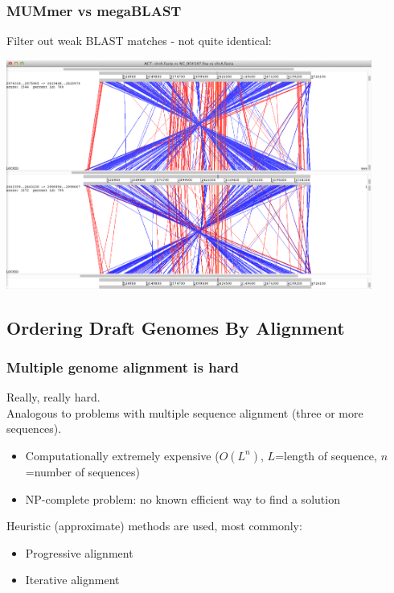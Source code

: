 \begin{frame}
  \frametitle{MUMmer vs megaBLAST}
  Filter out weak BLAST matches - not quite identical:
  \begin{center}
    \includegraphics[width=0.9\textwidth]{images/act_wgs10}
  \end{center}    
\end{frame}

\subsection{Ordering Draft Genomes By Alignment}

\begin{frame}
  \frametitle{Multiple genome alignment is hard}
  Really, really hard.\\[0.2cm]
  Analogous to problems with multiple sequence alignment (three or more sequences).
  \begin{itemize}
    \item Computationally extremely expensive ($O(L^n)$, $L$=length of sequence, $n$=number of sequences) 
    \item NP-complete problem: no known efficient way to find a solution
  \end{itemize}
  Heuristic (approximate) methods are used, most commonly:
  \begin{itemize}
    \item Progressive alignment
    \item Iterative alignment
  \end{itemize}
\end{frame}

